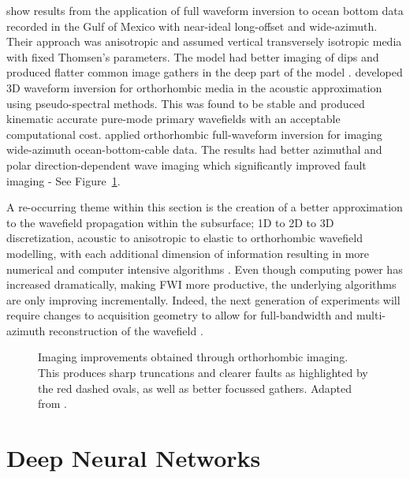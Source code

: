 \citet{Plessix2010} show results from the application of full waveform inversion to ocean bottom data recorded in the Gulf of Mexico with near-ideal long-offset and wide-azimuth. Their approach was anisotropic and assumed vertical transversely isotropic media with fixed Thomsen’s parameters. The model had better imaging of dips and produced flatter common image gathers in the deep part of the model \citep{Plessix2010}. \cite{Wang2016} developed 3D waveform inversion for orthorhombic media in the acoustic approximation using pseudo-spectral methods. This was found to be stable and produced kinematic accurate pure-mode primary wavefields with an acceptable computational cost. \cite{Xie2017} applied orthorhombic full-waveform inversion for imaging wide-azimuth ocean-bottom-cable data. The results had better azimuthal and polar direction-dependent wave imaging which significantly improved fault imaging -  See Figure~\ref{fig:ortho_fwi}.

A re-occurring theme within this section is the creation of a better approximation to the wavefield propagation within the subsurface; 1D to 2D to 3D discretization, acoustic to anisotropic to elastic to orthorhombic wavefield modelling, with each additional dimension of information resulting in more numerical and computer intensive algorithms \citep{Kumar2012}. Even though computing power has increased dramatically, making FWI more productive, the underlying algorithms are only improving incrementally. Indeed, the next generation of experiments will require changes to acquisition geometry to allow for full-bandwidth and multi-azimuth reconstruction of the wavefield \citep{Morgan2016}.

\begin{figure}[!ht]
	\centering
	\caption[Imaging improvements obtained through orthorhombic imaging.]{Imaging improvements obtained through orthorhombic imaging. This produces sharp truncations and clearer faults as highlighted by the red dashed ovals, as well as better focussed gathers. Adapted from \cite{Xie2017}.}        
	\label{fig:ortho_fwi}
\end{figure}

\section{Deep Neural Networks}

